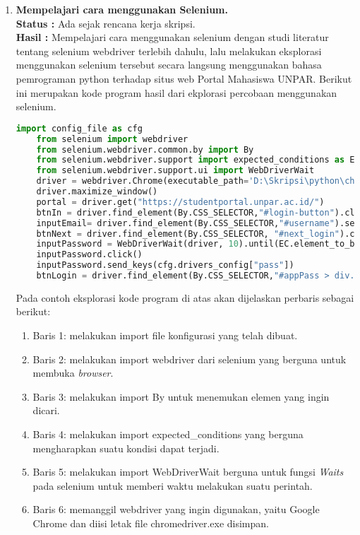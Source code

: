 \documentclass[a4paper,twoside]{article}
\begin{document}
\begin{enumerate}
		\item \textbf{Mempelajari cara menggunakan Selenium.}\\
		{\bf Status :} Ada sejak rencana kerja skripsi.\\
		{\bf Hasil :} Mempelajari cara menggunakan selenium dengan studi literatur tentang selenium webdriver terlebih dahulu, lalu melakukan eksplorasi menggunakan selenium tersebut secara langsung menggunakan bahasa pemrograman python terhadap situs web Portal Mahasiswa UNPAR. Berikut ini merupakan kode program hasil dari ekplorasi percobaan menggunakan selenium.
		\begin{lstlisting}[language=python, caption=Eksplorasi kode Program menggunakan Selenium]
	import config_file as cfg
	from selenium import webdriver
	from selenium.webdriver.common.by import By
	from selenium.webdriver.support import expected_conditions as EC
	from selenium.webdriver.support.ui import WebDriverWait
	driver = webdriver.Chrome(executable_path='D:\Skripsi\python\chromedriver.exe')
	driver.maximize_window()
	portal = driver.get("https://studentportal.unpar.ac.id/")
	btnIn = driver.find_element(By.CSS_SELECTOR,"#login-button").click()
	inputEmail= driver.find_element(By.CSS_SELECTOR,"#username").send_keys(cfg.drivers_config["email"])
	btnNext = driver.find_element(By.CSS_SELECTOR, "#next_login").click()
	inputPassword = WebDriverWait(driver, 10).until(EC.element_to_be_clickable((By.CSS_SELECTOR,"#password")))
	inputPassword.click()
	inputPassword.send_keys(cfg.drivers_config["pass"])
	btnLogin = driver.find_element(By.CSS_SELECTOR,"#appPass > div.login__form > button").click()\end{lstlisting}
	Pada contoh eksplorasi kode program di atas akan dijelaskan perbaris sebagai berikut:
	\begin{enumerate}
		\item Baris 1: melakukan import file konfigurasi yang telah dibuat.
		\item Baris 2: melakukan import webdriver dari selenium yang berguna untuk membuka \textit{browser}.
		\item Baris 3: melakukan import By untuk menemukan elemen yang ingin dicari.
		\item Baris 4: melakukan import expected\_conditions yang berguna mengharapkan suatu kondisi dapat terjadi.
		\item Baris 5: melakukan import WebDriverWait berguna untuk fungsi \textit{Waits} pada selenium untuk memberi waktu melakukan suatu perintah.
		\item Baris 6: memanggil webdriver yang ingin digunakan, yaitu Google Chrome dan diisi letak file chromedriver.exe disimpan.

\end{enumerate}
\end{enumerate}
\end{document}

